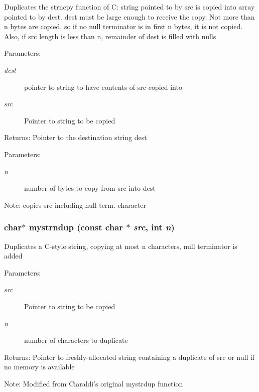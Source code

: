 Duplicates the strncpy function of C: string pointed to by src is copied into array pointed to by dest. dest must be large enough to receive the copy. Not more than n bytes are copied, so if no null terminator is in first n bytes, it is not copied. Also, if src length is less than n, remainder of dest is filled with nulls \begin{Desc}
\item[Parameters:]
\begin{description}
\item[{\em dest}]pointer to string to have contents of src copied into \item[{\em src}]Pointer to string to be copied \end{description}
\end{Desc}
\begin{Desc}
\item[Returns:]Pointer to the destination string dest \end{Desc}
\begin{Desc}
\item[Parameters:]
\begin{description}
\item[{\em n}]number of bytes to copy from src into dest \end{description}
\end{Desc}
\begin{Desc}
\item[Note:]copies src including null term. character \end{Desc}
\subsubsection{\setlength{\rightskip}{0pt plus 5cm}char$\ast$ mystrndup (const char $\ast$ {\em src}, int {\em n})}\label{mystring_8h_4ed664b8f2f1131da7a773fa4fd7c708}


Duplicates a C-style string, copying at most n characters, null terminator is added \begin{Desc}
\item[Parameters:]
\begin{description}
\item[{\em src}]Pointer to string to be copied \item[{\em n}]number of characters to duplicate \end{description}
\end{Desc}
\begin{Desc}
\item[Returns:]Pointer to freshly-allocated string containing a duplicate of src or null if no memory is available \end{Desc}
\begin{Desc}
\item[Note:]Modified from Ciaraldi's original mystrdup function \end{Desc}

